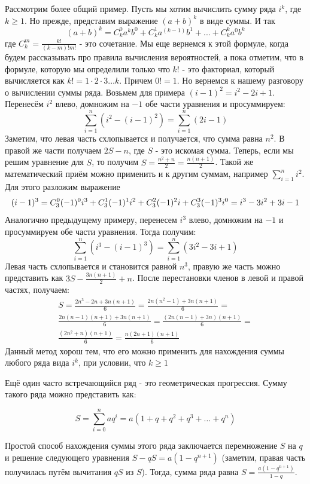 Рассмотрим более общий пример. Пусть мы хотим вычислить сумму ряда $i^k$, где $k \ge 1$.
Но прежде, представим выражение $(a+b)^k$ в виде суммы. И так 
$$(a+b)^k = C^0_k a^kb^0+C^1_ka^{(k-1)}b^1 + ... + C^k_ka^0b^k$$
где $C^m_k = \frac{k!}{(k-m)!m!}$ - это сочетание.
Мы еще вернемся к этой формуле, когда будем рассказывать про правила вычисления
вероятностей, а пока отметим, что в формуле, которую мы определили только что $k!$ - это 
факториал, который вычисляется как $k! = 1\cdot2\cdot3\ldots k$. Причем $0!=1$.
Но вернемся к нашему разговору о вычислении суммы ряда. Возьмем для
примера $(i-1)^2 = i^2 - 2i + 1$.
Перенесём $i^2$ влево, домножим на $-1$ обе части уравнения и просуммируем:
$$\sum_{i=1}^n (i^2 - (i-1)^2) = \sum_{i=1}^n (2i - 1)$$
Заметим, что левая часть схлопывается и получается, что сумма 
равна $n^2$. В правой же части получаем $2S-n$, где $S$ - это искомая сумма.
Теперь, если мы решим уравнение для $S$, то получим
$S = \frac{n^2+n}{2} = \frac{n(n+1)}{2}$.
Такой же математический приём можно применить и к другим суммам, например $\sum_{i=1}^n i^2$.
Для этого разложим выражение 
$$(i-1)^3 = \\ 
C_3^0(-1)^0i^3+C_3^1(-1)^1i^2 + C_3^2(-1)^2i + C^3_3(-1)^3i^0 = \\
i^3-3i^2+3i-1$$
Аналогично предыдущему примеру, перенесем $i^3$ влево, домножим на $-1$ и
просуммируем обе части уравнения. Тогда получим:
$$\sum_{i=1}^n (i^3-(i-1)^3) = \sum_{i=1}^n(3i^2-3i+1)$$
Левая часть схлопывается и становится равной $n^3$, правую же часть можно представить как
$3S-\frac{3n(n+1)}{2} + n$. После перестановки членов в левой и правой частях, получаем:
\begin{equation*}
\begin{multlined}
S=\frac{2n^3 - 2n + 3n(n+1)}{6} = \frac{2n(n^2 - 1) + 3n(n + 1)}{6} = \\
\frac{2n(n - 1)(n+1) + 3n(n+1)}{6} = \frac{(2n(n - 1) + 3n)(n+1)}{6} = \\
\frac{(2n^2 + n)(n+1)}{6} = \frac{n(2n + 1)(n+1)}{6}
\end{multlined}
\end{equation*}
Данный метод хорош тем, что его можно применить для нахождения суммы любого ряда вида $i^k$, при условии, что $k \ge 1$

Ещё один часто встречающийся ряд - это геометрическая прогрессия. Сумму такого ряда можно представить
как:

$$S = \sum_{i=0}^{n}aq^i = a(1 + q + q^2 + q^3 + \ldots + q^n)$$

Простой способ нахождения суммы этого ряда заключается перемножение $S$ 
на $q$ и решение следующего уравнения $S - qS = a(1 - q^{n+1})$ (заметим, правая часть
получилась путём вычитания $qS$ из $S$). Тогда, сумма ряда равна $S=\frac{a(1-q^{n+1})}{1-q}$.


